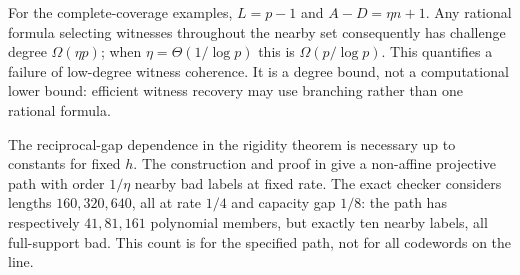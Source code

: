 For the complete-coverage examples, $L=p-1$ and
$A-D=\eta n+1$. Any rational formula selecting witnesses throughout
the nearby set consequently has challenge degree $\Omega(\eta p)$;
when $\eta=\Theta(1/\log p)$ this is $\Omega(p/\log p)$.
This quantifies a failure of low-degree witness coherence. It is a
degree bound, not a computational lower bound: efficient witness recovery
may use branching rather than one rational formula.

The reciprocal-gap dependence in the rigidity theorem is necessary up
to constants for fixed $h$. The construction and proof in
 give a
non-affine projective path with order $1/\eta$ nearby bad labels at fixed
rate. The exact checker considers lengths $160,320,640$, all at rate
$1/4$ and capacity gap $1/8$: the path has respectively $41,81,161$
polynomial members, but exactly ten nearby labels, all full-support bad.
This count is for the specified path, not for all codewords on the line.
